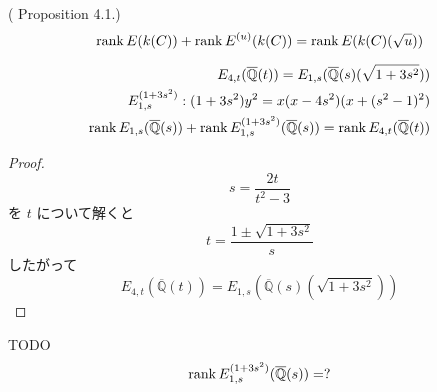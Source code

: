 \documentclass[main]{subfiles}
\begin{document}
\begin{thm}{(\cite{ref:naskrecki2013} Proposition 4.1.)}
    \begin{equation}
        \operatorname{rank} E(k(C)) + \operatorname{rank} E^{(u)}(k(C)) = \operatorname{rank} E(k(C)(\sqrt{u}))
    \end{equation}
\end{thm}

\begin{thm}
    \begin{align}
        E_{4,t}(\overline{\mathbb{Q}}(t)) = E_{1,s}(\overline{\mathbb{Q}}(s)(\sqrt{1 + 3s^{2}})) \\
        E_{1,s}^{(1 + 3s^{2})}: (1 + 3s^{2}) y^{2} = x(x - 4s^{2})(x + (s^{2} - 1)^{2})          \\
        \operatorname{rank} E_{1,s}(\overline{\mathbb{Q}}(s)) + \operatorname{rank} E_{1,s}^{(1 + 3s^{2})}(\overline{\mathbb{Q}}(s)) = \operatorname{rank} E_{4,t}(\overline{\mathbb{Q}}(t))
    \end{align}
\end{thm}
\begin{proof}
    \begin{equation}
        s = \frac{2t}{t^{2} - 3}
    \end{equation}
    を $t$ について解くと
    \begin{equation}
        t = \frac{1 \pm \sqrt{1 + 3s^{2}}}{s}
    \end{equation}
    したがって
    \begin{equation}
        E_{4,t}(\overline{\mathbb{Q}}(t)) = E_{1,s}(\overline{\mathbb{Q}}(s)(\sqrt{1 + 3s^{2}}))
    \end{equation}
\end{proof}

\begin{thm}
    TODO
    \begin{equation}
        \operatorname{rank} E_{1,s}^{(1 + 3s^{2})}(\overline{\mathbb{Q}}(s)) = ?
    \end{equation}
\end{thm}
\end{document}
